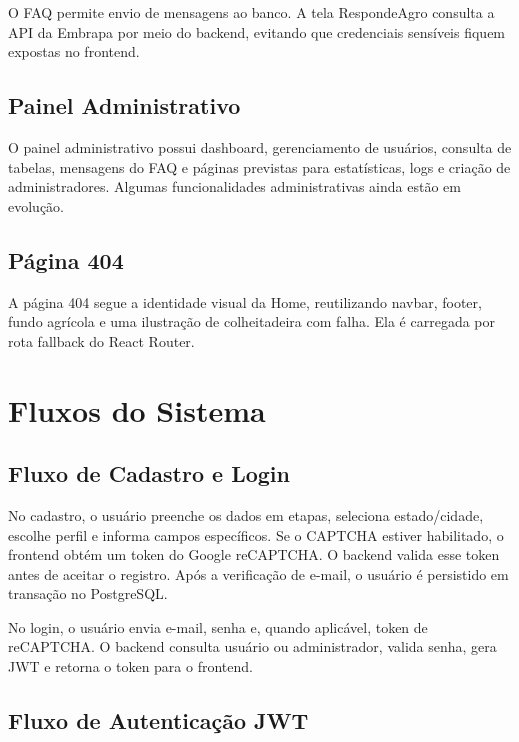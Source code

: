 \documentclass[
  12pt,
  oneside,
  a4paper,
  brazil
]{abntex2}
\begin{document}
O FAQ permite envio de mensagens ao banco. A tela RespondeAgro consulta a API da Embrapa por meio do backend, evitando que credenciais sensíveis fiquem expostas no frontend.

\section{Painel Administrativo}

O painel administrativo possui dashboard, gerenciamento de usuários, consulta de tabelas, mensagens do FAQ e páginas previstas para estatísticas, logs e criação de administradores. Algumas funcionalidades administrativas ainda estão em evolução.

\section{Página 404}

A página 404 segue a identidade visual da Home, reutilizando navbar, footer, fundo agrícola e uma ilustração de colheitadeira com falha. Ela é carregada por rota fallback do React Router.


\chapter{Fluxos do Sistema}

\section{Fluxo de Cadastro e Login}

No cadastro, o usuário preenche os dados em etapas, seleciona estado/cidade, escolhe perfil e informa campos específicos. Se o CAPTCHA estiver habilitado, o frontend obtém um token do Google reCAPTCHA. O backend valida esse token antes de aceitar o registro. Após a verificação de e-mail, o usuário é persistido em transação no PostgreSQL.

No login, o usuário envia e-mail, senha e, quando aplicável, token de reCAPTCHA. O backend consulta usuário ou administrador, valida senha, gera JWT e retorna o token para o frontend.

\section{Fluxo de Autenticação JWT}
\end{document}
